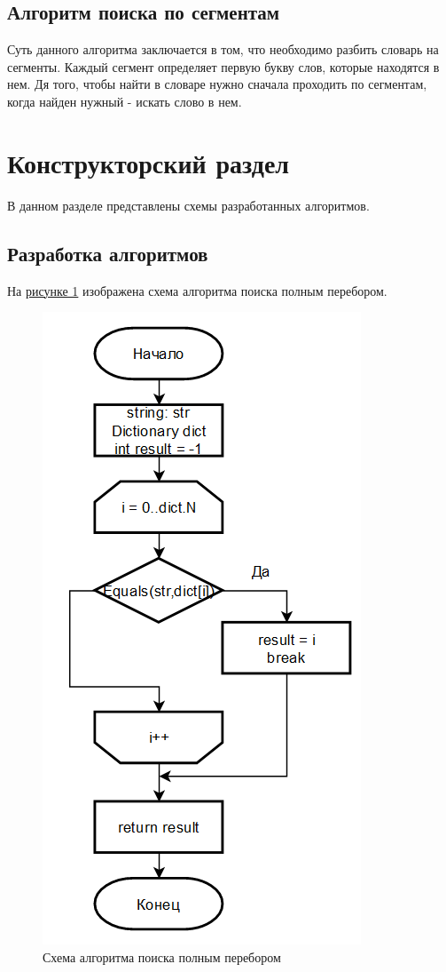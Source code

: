 \documentclass[14pt, a4paper]{extarticle}
\begin{document}
\subsection{Алгоритм поиска по сегментам}
Суть данного алгоритма заключается в том, что необходимо разбить словарь на сегменты. Каждый сегмент определяет первую букву слов, которые находятся в нем. Дя того, чтобы найти в словаре нужно сначала проходить по сегментам, когда найден нужный - искать слово в нем.

\clearpage
\section{Конструкторский раздел}
В данном разделе представлены схемы разработанных алгоритмов.
\subsection{Разработка алгоритмов}
На \hyperref[Schema1]{рисунке 1} изображена схема алгоритма поиска полным перебором.
\begin{figure}[h!]
	\centering
	\includegraphics[scale=0.9]{source/alg1.png}
	\caption{Схема алгоритма поиска полным перебором}
	\label{Schema1}
\end{figure}
\end{document}
